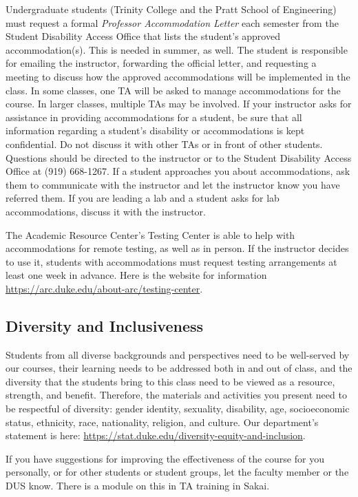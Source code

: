 \documentclass[
]{article}
\begin{document}
Undergraduate students (Trinity College and the Pratt School of Engineering) must request a formal \emph{Professor Accommodation Letter} each semester from the Student Disability Access Office that lists the student's approved accommodation(s). This is needed in summer, as well. The student is responsible for emailing the instructor, forwarding the official letter, and requesting a meeting to discuss how the approved accommodations will be implemented in the class. In some classes, one TA will be asked to manage accommodations for the course. In larger classes, multiple TAs may be involved. If your instructor asks for assistance in providing accommodations for a student, be sure that all information regarding a student's disability or accommodations is kept confidential. Do not discuss it with other TAs or in front of other students. Questions should be directed to the instructor or to the Student Disability Access Office at (919) 668-1267. If a student approaches you about accommodations, ask them to communicate with the instructor and let the instructor know you have referred them. If you are leading a lab and a student asks for lab accommodations, discuss it with the instructor.

The Academic Resource Center's Testing Center is able to help with accommodations for remote testing, as well as in person. If the instructor decides to use it, students with accommodations must request testing arrangements at least one week in advance. Here is the website for information \url{https://arc.duke.edu/about-arc/testing-center}.

\hypertarget{diversity-and-inclusiveness}{%
\subsection{Diversity and Inclusiveness}\label{diversity-and-inclusiveness}}

Students from all diverse backgrounds and perspectives need to be well-served by our courses, their learning needs to be addressed both in and out of class, and the diversity that the students bring to this class need to be viewed as a resource, strength, and benefit. Therefore, the materials and activities you present need to be respectful of diversity: gender identity, sexuality, disability, age, socioeconomic status, ethnicity, race, nationality, religion, and culture. Our department's statement is here: \url{https://stat.duke.edu/diversity-equity-and-inclusion}.

If you have suggestions for improving the effectiveness of the course for you personally, or for other students or student groups, let the faculty member or the DUS know. There is a module on this in TA training in Sakai.
\end{document}
